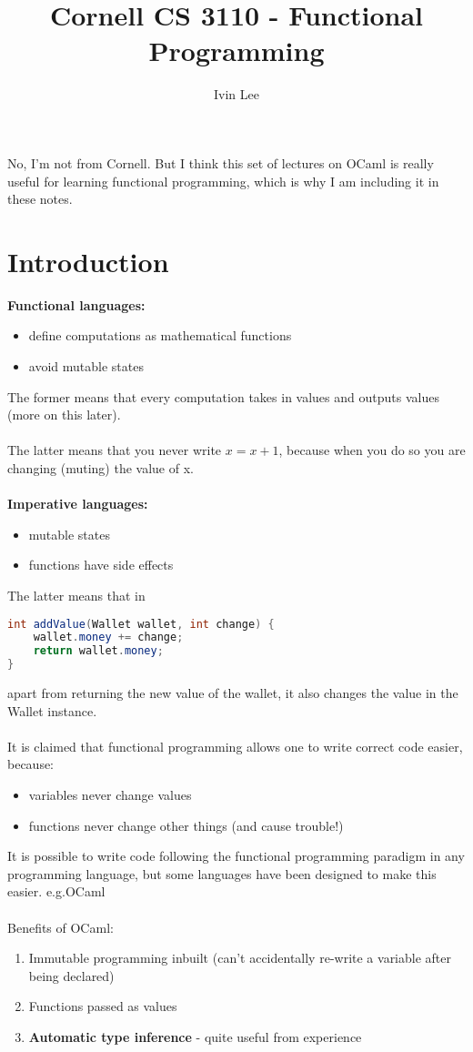 \documentclass[12pt,a4paper]{article} %
\author{Ivin Lee}
\title{Cornell CS 3110 - Functional Programming}
\begin{document}
\maketitle
No, I'm not from Cornell. But I think this set of lectures on OCaml is really useful for learning functional programming, which is why I am including it in these notes.
\section{Introduction}
\textbf{Functional languages: }
\begin{itemize}
	\item define computations as mathematical functions
	\item avoid mutable states
\end{itemize}
The former means that every computation takes in values and outputs values (more on this later).
\\\\
The latter means that you never write $x = x + 1$, because when you do so you are changing (muting) the value of x.
\\\\
\textbf{Imperative languages:}
\begin{itemize}
	\item mutable states
	\item functions have side effects
\end{itemize}
The latter means that in
\begin{lstlisting}[language = Java]
int addValue(Wallet wallet, int change) {
	wallet.money += change;
	return wallet.money;
}
\end{lstlisting}
apart from returning the new value of the wallet, it also changes the value in the Wallet instance.
\\\\
It is claimed that functional programming allows one to write correct code easier, because:
\begin{itemize}
	\item variables never change values
	\item functions never change other things (and cause trouble!)
\end{itemize}
It is possible to write code following the functional programming paradigm in any programming language, but some languages have been designed to make this easier. e.g.OCaml
\\\\
Benefits of OCaml:
\begin{enumerate}
	\item Immutable programming inbuilt (can't accidentally re-write a variable after being declared)
	\item Functions passed as values
	\item \textbf{Automatic type inference} - quite useful from experience
\end{enumerate}
\end{document}
